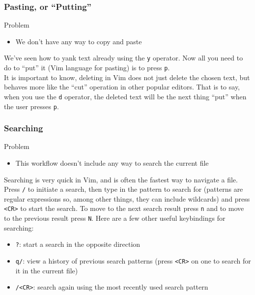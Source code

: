 \documentclass{beamer}
\begin{document}
\begin{frame}[fragile]
    \frametitle{Pasting, or \enquote{Putting}}
    \small
    \begin{block}{Problem}
	\begin{itemize}
	    \item We don't have any way to copy and paste
	\end{itemize}
    \end{block}
    We've seen how to yank text already using the \verb+y+ operator. Now all you need to do to \enquote{put} it (Vim language for pasting) is to press \verb+p+.\\
    \vspace{0.5cm}
    It is important to know, deleting in Vim does not just delete the chosen text, but behaves more like the \enquote{cut} operation in other popular editors. That is to say, when you use the \verb+d+ operator, the deleted text will be the next thing \enquote{put} when the user presses \verb+p+.
\end{frame}

\begin{frame}[fragile]
    \frametitle{Searching}
    \small
    \begin{block}{Problem}
	\begin{itemize}
	    \item This workflow doesn't include any way to search the current file
	\end{itemize}
    \end{block}
    Searching is very quick in Vim, and is often the fastest way to navigate a file. Press \verb+/+ to initiate a search, then type in the pattern to search for (patterns are regular expressions so, among other things, they can include wildcards) and press \verb+<CR>+ to start the search. To move to the next search result press \verb+n+ and to move to the previous result press \verb+N+. Here are a few other useful keybindings for searching:
    \begin{itemize}
	\item \verb+?+: start a search in the opposite direction
	\item \verb+q/+: view a history of previous search patterns (press \verb+<CR>+ on one to search for it in the current file)
	\item \verb+/<CR>+: search again using the most recently used search pattern
    \end{itemize}
\end{frame}
\end{document}
